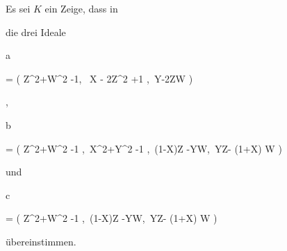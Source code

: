 {} {}




{}


{


Es sei $K$ ein
Zeige, dass in


 die drei Ideale


\mavergleichskettedisp


{\vergleichskette


{ {\mathfrak a}
}


{ =} { \left(  Z^2+W^2 -1, \, X - 2Z^2 +1 ,\, Y-2ZW  \right)
}


{ } {
}


{ } {
}


{ } {
}


}
{}{}{,}


\mavergleichskettedisp


{\vergleichskette


{ {\mathfrak b}
}


{ =} { \left(  Z^2+W^2 -1 ,\, X^2+Y^2 -1 ,\, (1-X)Z -YW,\, YZ- (1+X) W  \right)
}


{ } {
}


{ } {
}


{ } {
}


}
{}{}{}
und


\mavergleichskettedisp


{\vergleichskette


{ {\mathfrak c}
}


{ =} { \left(  Z^2+W^2 -1 ,\, (1-X)Z -YW,\, YZ- (1+X) W  \right)
}


{ } {
}


{ } {
}


{ } {
}


}
{}{}{}
übereinstimmen.


}


{} {}




{}


